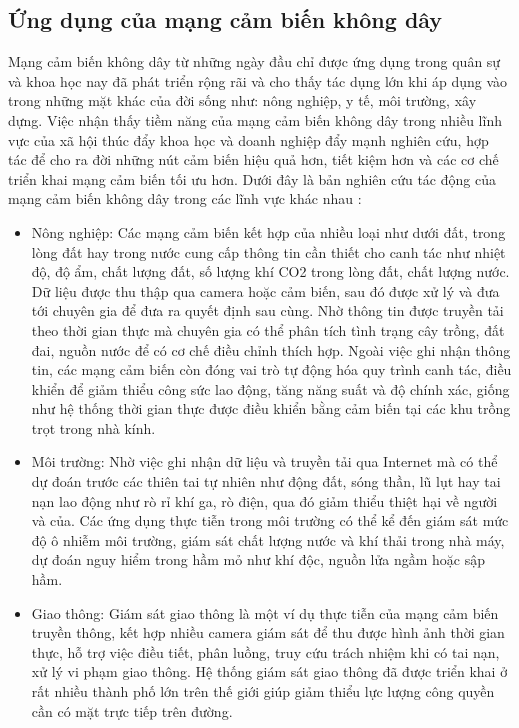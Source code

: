 \documentclass{hust}
\begin{document}
\subsection{Ứng dụng của mạng cảm biến không dây}
Mạng cảm biến không dây từ những ngày đầu chỉ được ứng dụng trong quân sự và khoa học nay đã phát triển rộng rãi và cho thấy tác dụng lớn khi áp dụng vào trong những mặt khác của đời sống như: nông nghiệp, y tế, môi trường, xây dựng. Việc nhận thấy tiềm năng của mạng cảm biến không dây trong nhiều lĩnh vực của xã hội thúc đẩy khoa học và doanh nghiệp đẩy mạnh nghiên cứu, hợp tác để cho ra đời những nút cảm biến hiệu quả hơn, tiết kiệm hơn và các cơ chế triển khai mạng cảm biến tối ưu hơn. Dưới đây là bản nghiên cứu tác động của mạng cảm biến không dây trong các lĩnh vực khác nhau \cite{ramson2017applications}:
\begin{itemize}
	\item Nông nghiệp: Các mạng cảm biến kết hợp của nhiều loại như dưới đất, trong lòng đất hay trong nước cung cấp thông tin cần thiết cho canh tác như nhiệt độ, độ ẩm, chất lượng đất, số lượng khí CO2 trong lòng đất, chất lượng nước. Dữ liệu được thu thập qua camera hoặc cảm biến, sau đó được xử lý và đưa tới chuyên gia để đưa ra quyết định sau cùng. Nhờ thông tin được truyền tải theo thời gian thực mà chuyên gia có thể phân tích tình trạng cây trồng, đất đai, nguồn nước để có cơ chế điều chỉnh thích hợp. Ngoài việc ghi nhận thông tin, các mạng cảm biến còn đóng vai trò tự động hóa quy trình canh tác, điều khiển để giảm thiểu công sức lao động, tăng năng suất và độ chính xác, giống như hệ thống thời gian thực được điều khiển bằng cảm biến tại các khu trồng trọt trong nhà kính.
	\item Môi trường: Nhờ việc ghi nhận dữ liệu và truyền tải qua Internet mà có thể dự đoán trước các thiên tai tự nhiên như động đất, sóng thần, lũ lụt hay tai nạn lao động như rò rỉ khí ga, rò điện, qua đó giảm thiểu thiệt hại về người và của. Các ứng dụng thực tiễn trong môi trường có thể kể đến giám sát mức độ ô nhiễm môi trường, giám sát chất lượng nước và khí thải trong nhà máy, dự đoán nguy hiểm trong hầm mỏ như khí độc, nguồn lửa ngầm hoặc sập hầm. 
	\item Giao thông: Giám sát giao thông là một ví dụ thực tiễn của mạng cảm biến truyền thông, kết hợp nhiều camera giám sát để thu được hình ảnh thời gian thực, hỗ trợ việc điều tiết, phân luồng, truy cứu trách nhiệm khi có tai nạn, xử lý vi phạm giao thông. Hệ thống giám sát giao thông đã được triển khai ở rất nhiều thành phố lớn trên thế giới giúp giảm thiểu lực lượng công quyền cần có mặt trực tiếp trên đường. 

\end{itemize}
\end{document}
